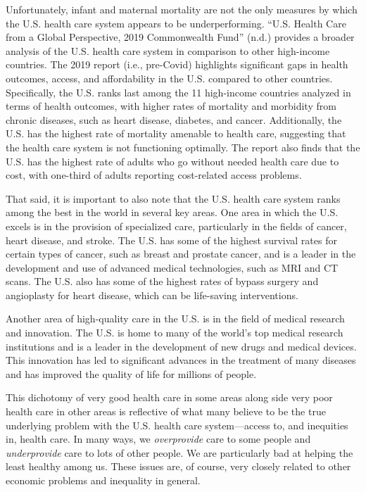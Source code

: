 \documentclass[
  letterpaper,
  DIV=11,
  numbers=noendperiod]{scrreport}
\theoremstyle{definition}
\theoremstyle{remark}
\begin{document}
Unfortunately, infant and maternal mortality are not the only measures
by which the U.S. health care system appears to be underperforming.
{``U.{S}. {Health} {Care} from a {Global} {Perspective}, 2019 {\textbar}
{Commonwealth} {Fund}''} (n.d.) provides a broader analysis of the U.S.
health care system in comparison to other high-income countries. The
2019 report (i.e., pre-Covid) highlights significant gaps in health
outcomes, access, and affordability in the U.S. compared to other
countries. Specifically, the U.S. ranks last among the 11 high-income
countries analyzed in terms of health outcomes, with higher rates of
mortality and morbidity from chronic diseases, such as heart disease,
diabetes, and cancer. Additionally, the U.S. has the highest rate of
mortality amenable to health care, suggesting that the health care
system is not functioning optimally. The report also finds that the U.S.
has the highest rate of adults who go without needed health care due to
cost, with one-third of adults reporting cost-related access problems.

That said, it is important to also note that the U.S. health care system
ranks among the best in the world in several key areas. One area in
which the U.S. excels is in the provision of specialized care,
particularly in the fields of cancer, heart disease, and stroke. The
U.S. has some of the highest survival rates for certain types of cancer,
such as breast and prostate cancer, and is a leader in the development
and use of advanced medical technologies, such as MRI and CT scans. The
U.S. also has some of the highest rates of bypass surgery and
angioplasty for heart disease, which can be life-saving interventions.

Another area of high-quality care in the U.S. is in the field of medical
research and innovation. The U.S. is home to many of the world's top
medical research institutions and is a leader in the development of new
drugs and medical devices. This innovation has led to significant
advances in the treatment of many diseases and has improved the quality
of life for millions of people.

This dichotomy of very good health care in some areas along side very
poor health care in other areas is reflective of what many believe to be
the true underlying problem with the U.S. health care system---access
to, and inequities in, health care. In many ways, we \emph{overprovide}
care to some people and \emph{underprovide} care to lots of other
people. We are particularly bad at helping the least healthy among us.
These issues are, of course, very closely related to other economic
problems and inequality in general.
\end{document}
